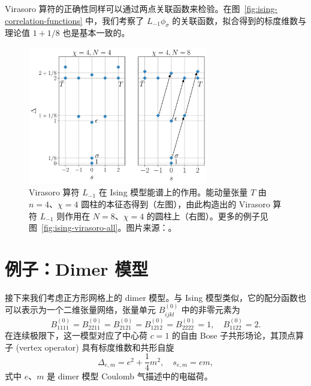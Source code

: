 Virasoro 算符的正确性同样可以通过两点关联函数来检验。在图~\ref{fig:ising-correlation-functions} 中，我们考察了 $L_{-1}\phi_\sigma$ 的关联函数，拟合得到的标度维数与理论值 $1+1/8$ 也是基本一致的。

\begin{figure}[ht]
  \centering
  \includegraphics[width=0.7\textwidth]{images/virasoro/ising-spectrum.pdf}
  \caption[Virasoro 算符在 Ising 模型能谱上的作用]{Virasoro 算符 $L_{-1}$ 在 Ising 模型能谱上的作用。能动量张量 $T$ 由 $n=4$、$\chi=4$ 圆柱的本征态得到（左图），由此构造出的 Virasoro 算符 $L_{-1}$ 则作用在 $N=8$、$\chi=4$ 的圆柱上（右图）。更多的例子见图~\ref{fig:ising-virasoro-all}。图片来源：\parencite{wang2022virasoro}。}
  \label{fig:ising-virasoro}
\end{figure}

\section{例子：Dimer 模型}

接下来我们考虑正方形网格上的 dimer 模型\cite{kasteleyn1961statistics,temperley1961dimer,kasteleyn1963dimer}。与 Ising 模型类似，它的配分函数也可以表示为一个二维张量网络，张量单元 $B^{(0)}_{ijkl}$ 中的非零元素为
\begin{equation}
  B^{(0)}_{1111} = B^{(0)}_{2211} = B^{(0)}_{2121} = B^{(0)}_{1212} = B^{(0)}_{2222} = 1, \quad
  B^{(0)}_{1122} = 2.
\end{equation}
在连续极限下，这一模型对应了中心荷 $c=1$ 的自由 Bose 子共形场论\cite{ioffe1989superconductivity,henley1997relaxation,allegra2015exact}，其顶点算子 (vertex operator) 具有标度维数和共形自旋
\begin{equation}
  \Delta_{e,m} = e^2 + \frac14 m^2, \quad
  s_{e,m} = em,
\end{equation}
式中 $e$、$m$ 是 dimer 模型 Coulomb 气描述中的电磁荷。

